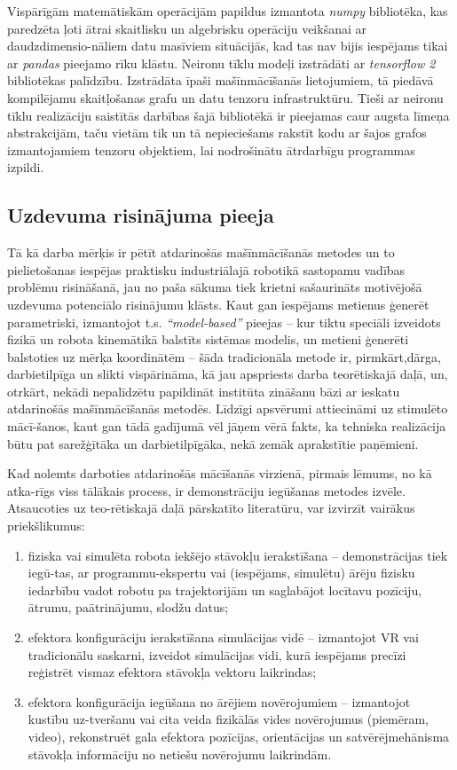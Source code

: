 \documentclass[12pt, a4paper]{article}
\numberwithin{equation}{section} %
\begin{document}
Vispārīgām matemātiskām operācijām papildus izmantota \textit{numpy} \cite{numpy_docs} bibliotēka, kas paredzēta ļoti ātrai skaitlisku un algebrisku operāciju veikšanai ar daudzdimensio-nāliem datu masīviem situācijās, kad tas nav bijis iespējams tikai ar \textit{pandas} pieejamo rīku klāstu. Neironu tīklu modeļi izstrādāti ar \textit{tensorflow 2} \cite{tf_docs} bibliotēkas palīdzību. Izstrādāta īpaši mašīnmācīšanās lietojumiem, tā piedāvā kompilējamu skaitļošanas grafu un datu tenzoru infrastruktūru. Tieši ar neironu tīklu realizāciju saistītās darbības šajā bibliotēkā ir pieejamas caur augsta līmeņa abstrakcijām, taču vietām tik un tā nepieciešams rakstīt kodu ar šajos grafos izmantojamiem tenzoru objektiem, lai nodrošinātu ātrdarbīgu programmas izpildi.

\subsection{Uzdevuma risinājuma pieeja}

Tā kā darba mērķis ir pētīt atdarinošās mašīnmācīšanās metodes un to pielietošanas iespējas praktisku industriālajā robotikā sastopamu vadības problēmu risināšanā, jau no paša sākuma tiek krietni sašaurināts motivējošā uzdevuma potenciālo risinājumu klāsts. Kaut gan iespējams metienus ģenerēt parametriski, izmantojot t.s. \textit{``model-based''} pieejas -- kur tiktu speciāli izveidots fizikā un robota kinemātikā balstīts sistēmas modelis, un metieni ģenerēti balstoties uz mērķa koordinātēm -- šāda tradicionāla metode ir, pirmkārt,dārga, darbietilpīga un slikti vispārināma, kā jau apspriests darba teorētiskajā daļā, un, otrkārt, nekādi nepalīdzētu papildināt institūta zināšanu bāzi ar ieskatu atdarinošās mašīnmācīšanās metodēs. Līdzīgi apsvērumi attiecināmi uz stimulēto mācī-šanos, kaut gan tādā gadījumā vēl jāņem vērā fakts, ka tehniska realizācija būtu pat sarežģītāka un darbietilpīgāka, nekā zemāk aprakstītie paņēmieni.

Kad nolemts darboties atdarinošās mācīšanās virzienā, pirmais lēmums, no kā atka-rīgs viss tālākais process, ir demonstrāciju iegūšanas metodes izvēle. Atsaucoties uz teo-rētiskajā daļā pārskatīto literatūru, var izvirzīt vairākus priekšlikumus:

\begin{enumerate}
    \item fiziska vai simulēta robota iekšējo stāvokļu ierakstīšana -- demonstrācijas tiek iegū-tas, ar programmu-ekspertu vai (iespējams, simulētu) ārēju fizisku iedarbību vadot robotu pa trajektorijām un saglabājot locītavu pozīciju, ātrumu, paātrinājumu, slodžu datus;
    \item efektora konfigurāciju ierakstīšana simulācijas vidē -- izmantojot VR vai tradicionālu saskarni, izveidot simulācijas vidi, kurā iespējams precīzi reģistrēt vismaz efektora stāvokļa vektoru laikrindas;
    \item efektora konfigurācija iegūšana no ārējiem novērojumiem -- izmantojot kustību uz-tveršanu vai cita veida fizikālās vides novērojumus (piemēram, video), rekonstruēt gala efektora pozīcijas, orientācijas un satvērējmehānisma stāvokļa informāciju no netiešu novērojumu laikrindām.
\end{enumerate}
\end{document}
